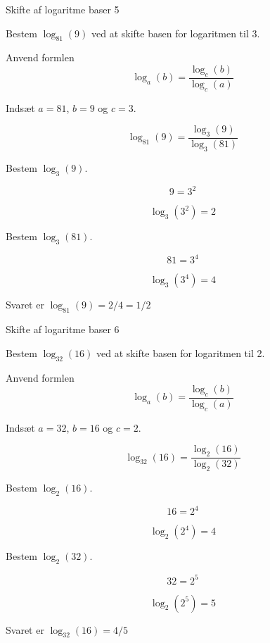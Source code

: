 \documentclass{article}
\begin{document}
\newpage
\begin{exercise}{Skifte af logaritme baser 5}

Bestem $\log_{81}(9)$ ved at skifte basen for logaritmen til 3.


\hint

Anvend formlen
\[
\log_a(b) = \frac{\log_c(b)}{\log_c(a)}
\]

\hint

Indsæt $a=81$, $b=9$ og $c=3$.

\hint
\[
\log_{81}(9) = \frac{\log_3(9)}{\log_3(81)}
\]

\hint
Bestem $\log_3(9)$.

\hint
\[
9 = 3^2
\]


\hint
\[
\log_3(3^2) = 2
\]

\hint
Bestem $\log_3(81)$.

\hint
\[
81 = 3^4
\]

\hint
\[
\log_3(3^4) = 4
\]

\hint
Svaret er $\log_{81}(9) = 2/4 = 1/2$


\end{exercise}

\newpage
\begin{exercise}{Skifte af logaritme baser 6}

Bestem $\log_{32}(16)$ ved at skifte basen for logaritmen til 2.


\hint

Anvend formlen
\[
\log_a(b) = \frac{\log_c(b)}{\log_c(a)}
\]

\hint

Indsæt $a=32$, $b=16$ og $c=2$.

\hint
\[
\log_{32}(16) = \frac{\log_2(16)}{\log_2(32)}
\]

\hint
Bestem $\log_2(16)$.

\hint
\[
16 = 2^4
\]


\hint
\[
\log_2(2^4) = 4
\]

\hint
Bestem $\log_2(32)$.

\hint
\[
32 = 2^5
\]

\hint
\[
\log_2(2^5) = 5
\]

\hint
Svaret er $\log_{32}(16) = 4/5$


\end{exercise}
\end{document}
